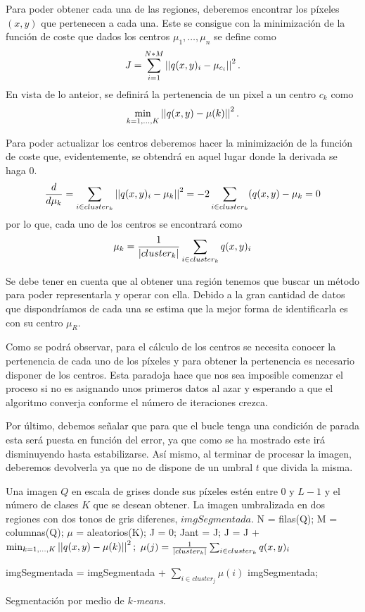 Para poder obtener cada una de las regiones, deberemos encontrar los píxeles $(x,y)$ que pertenecen a cada una. Este se consigue con la minimización de la función de coste que dados los centros $\mu_1, \dots,\mu_n$ se define como
$$J=\sum_{i=1}^{N*M}\left\vert\left\vert q(x,y)_i-\mu_{c_i}\right\vert\right\vert^2.$$
En vista de lo anteior, se definirá la pertenencia de un pixel a un centro $c_k$ como 
$$\min_{k=1,\dots,K} \left\vert\left\vert q(x,y)-\mu(k)\right\vert\right\vert^2.$$

Para poder actualizar los centros deberemos hacer la minimización de la función de coste que, evidentemente, se obtendrá en aquel lugar donde la derivada se haga 0. 
$$\frac{d}{d \mu_k} = \sum_{i\in cluster_k} \left\vert\left\vert q(x,y)_i-\mu_k\right\vert\right\vert^2 = -2\sum_{i\in cluster_k}(q(x,y)-\mu_k=0$$
por lo que, cada uno de los centros se encontrará como 
$$\mu_k = \frac{1}{\left\vert cluster_k\right\vert}\sum_{i\in cluster_k}q(x,y)_i$$

Se debe tener en cuenta que al obtener una región tenemos que buscar un método para poder representarla y operar con ella. Debido a la gran cantidad de datos que dispondríamos de cada una se estima que la mejor forma de identificarla es con su centro $\mu_R$. 

Como se podrá observar, para el cálculo de los centros se necesita conocer la pertenencia de cada uno de los píxeles y para obtener la pertenencia es necesario disponer de los centros. Esta paradoja hace que nos sea imposible comenzar el proceso si no es asignando unos primeros datos al azar y esperando a que el algoritmo converja conforme el número de iteraciones crezca.

Por último, debemos señalar que para que el bucle tenga una condición de parada esta será puesta en función del error, ya que como se ha mostrado este irá disminuyendo hasta estabilizarse. Así mismo, al terminar de procesar la imagen, deberemos devolverla ya que no de dispone de un umbral $t$ que divida la misma.

\begin{algorithm}
\begin{algorithmic}[1]
\REQUIRE Una imagen $Q$ en escala de grises donde sus píxeles estén entre $0$ y $L-1$ y el número de clases $K$ que se desean obtener.
\ENSURE La imagen umbralizada en dos regiones con dos tonos de gris diferenes, $imgSegmentada$.
\STATE N = filas(Q);
\STATE M = columnas(Q);
\STATE $\mu$ = aleatorios(K);
\STATE J = 0;
\REPEAT 
    \STATE Jant = J;
            \STATE J = J + $\min_{k=1,\dots,K} \left\vert\left\vert q(x,y)-\mu(k)\right\vert\right\vert^2;$
        \ENDFOR
    \ENDFOR
        \STATE $\mu(j) = \frac{1}{\left\vert cluster_k\right\vert}\sum_{i\in cluster_k}q(x,y)_i$
    \ENDFOR 
{}

    \STATE imgSegmentada = imgSegmentada + $\sum_{i\in cluster_j}\mu(i)$
\ENDFOR
\RETURN imgSegmentada;
\end{algorithmic}
\caption{Segmentación por medio de {\em $k$-means}.}\label{alg:kmeans}
\end{algorithm}


